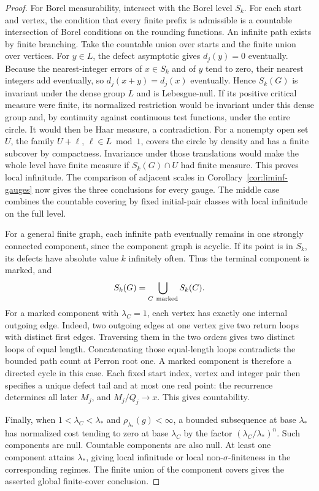 \begin{proof}
For Borel measurability, intersect with the Borel level $S_k$. For each
start and vertex, the condition that every finite prefix is admissible
is a countable intersection of Borel conditions on the rounding
functions. An infinite path exists by finite branching. Take the
countable union over starts and the finite union over vertices.
For $y\in L$, the defect asymptotic gives $d_j(y)=0$ eventually.
Because the nearest-integer errors of $x\in S_k$ and of $y$ tend to
zero, their nearest integers add eventually, so $d_j(x+y)=d_j(x)$
eventually. Hence $S_k(G)$ is invariant under the dense group $L$
and is Lebesgue-null. If its positive critical measure were finite,
its normalized restriction would be invariant under this dense group
and, by continuity against continuous test functions, under the
entire circle. It would then be Haar measure, a contradiction.
For a nonempty open set $U$, the family $U+\ell$, $\ell\in L\bmod 1$,
covers the circle by density and has a finite subcover by compactness.
Invariance under those translations would make the whole level have
finite measure if $S_k(G)\cap U$ had finite measure. This proves local
infinitude. The comparison of adjacent scales in
Corollary~\ref{cor:liminf-gauges} now gives the three conclusions for
every gauge. The middle case combines the countable covering by
fixed initial-pair classes with local infinitude on the full level.

For a general finite graph, each infinite path eventually remains
in one strongly connected component, since the component graph is
acyclic. If its point is in $S_k$, its defects have absolute value
$k$ infinitely often. Thus the terminal component is marked, and
\[
 S_k(G)=\bigcup_{C\ {\rm marked}} S_k(C).
\]
For a marked component with $\lambda_C=1$, each vertex has exactly
one internal outgoing edge. Indeed, two outgoing edges at one vertex
give two return loops with distinct first edges. Traversing them in
the two orders gives two distinct loops of equal length. Concatenating
those equal-length loops contradicts the bounded path count at
Perron root one. A marked component is therefore a directed cycle
in this case. Each fixed start index, vertex and integer pair
then specifies a unique defect tail and at most one real point:
the recurrence determines all later $M_j$, and $M_j/Q_j\to x$.
This gives countability.

Finally, when $1<\lambda_C<\lambda_*$ and
$\rho_{\lambda_*}(g)<\infty$, a bounded subsequence at base $\lambda_*$
has normalized cost tending to zero at base $\lambda_C$ by the
factor $(\lambda_C/\lambda_*)^n$. Such components are null.
Countable components are also null. At least one component attains
$\lambda_*$, giving local infinitude or local non-$\sigma$-finiteness
in the corresponding regimes. The finite union of the component
covers gives the asserted global finite-cover conclusion.
\end{proof}


